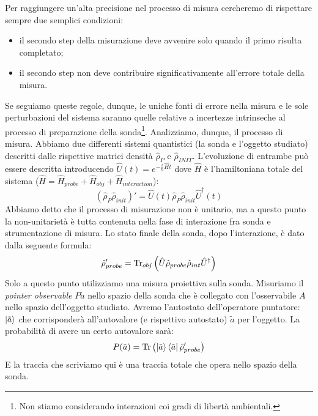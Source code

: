 Per raggiungere un'alta precisione nel processo di misura cercheremo di rispettare sempre due semplici condizioni:
\begin{itemize}
    \item il secondo step della misurazione deve avvenire solo quando il primo risulta completato;
    \item il secondo step non deve contribuire significativamente all'errore totale della misura.
\end{itemize}
Se seguiamo queste regole, dunque, le uniche fonti di errore nella misura e le sole perturbazioni del sistema saranno quelle relative a incertezze intrinseche al processo di preparazione della sonda\footnote{Non stiamo considerando interazioni coi gradi di libertà ambientali.}.
\vspace{1cm}
\noindent Analizziamo, dunque, il processo di misura.
Abbiamo due differenti sistemi quantistici (la sonda e l'oggetto studiato) descritti dalle rispettive matrici densità $\hat \rho _P$ e $\hat \rho _{INIT}$. L'evoluzione di entrambe può essere descritta introducendo $\hat U (t) = e^{-\frac{i}{\hbar}\hat H t}$ dove $\hat H$ è l'hamiltoniana totale del sistema ($\hat H = \hat H_{probe} + \hat H _{obj} + \hat H _{interaction}$):
\begin{equation*}
    (\hat \rho_P \hat \rho_{init})'=\hat U (t) \hat \rho_P \hat \rho_{init} \hat U ^\dagger (t)
\end{equation*}
\noindent Abbiamo detto che il processo di misurazione non è unitario, ma a questo punto la non-unitarietà è tutta contenuta nella fase di interazione fra sonda e strumentazione di misura.
Lo stato finale della sonda, dopo l'interazione, è dato dalla seguente formula:
\begin{equation*}
    \hat \rho_{probe}' = \Tr_{obj} \left( \hat U \hat \rho_{probe} \hat \rho_{int} \hat U ^\dagger \right)
\end{equation*}
\noindent Solo a questo punto utilizziamo una misura proiettiva sulla sonda. 
Misuriamo il \textit{pointer observable} $P\tilde a$ nello spazio della sonda che è collegato con l'osservabile $A$ nello spazio dell'oggetto studiato. Avremo l'autostato dell'operatore puntatore: $\ket{\tilde a}$ che corrisponderà all'autovalore (e rispettivo autostato) $\tilde a$ per l'oggetto.
La probabilità di avere un certo autovalore sarà:
\begin{equation*}
    P(\tilde a) = \Tr \left( \ket{\tilde a}\bra{\tilde a} \hat \rho_{probe}'\right)
\end{equation*}
E la traccia che scriviamo qui è una traccia totale che opera nello spazio della sonda.
